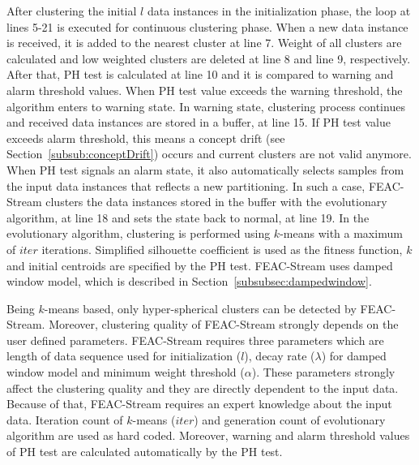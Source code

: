 \documentclass[smallcondensed]{svjour3}     %
\begin{document}
After clustering the initial $l$ data instances in the initialization phase, the loop at lines 5-21 is executed for continuous clustering phase. When a new data instance is received, it is added to the nearest cluster at line 7. Weight of all clusters are calculated and low weighted clusters are deleted at line 8 and line 9, respectively. After that, PH test is calculated at line 10 and it is compared to warning and alarm threshold values. When PH test value exceeds the warning threshold, the algorithm enters to warning state. In warning state, clustering process continues and received data instances are stored in a buffer, at line 15. If PH test value exceeds alarm threshold, this means a concept drift (see Section~\ref{subsub:conceptDrift}) occurs and current clusters are not valid anymore. When PH test signals an alarm state, it also automatically selects samples from the input data instances that reflects a new partitioning. In such a case, FEAC-Stream clusters the data instances stored in the buffer with the evolutionary algorithm, at line 18 and sets the state back to normal, at line 19. In the evolutionary algorithm, clustering is performed using $k$-means with a maximum of $iter$ iterations. Simplified silhouette coefficient is used as the fitness function, $k$ and initial centroids are specified by the PH test. FEAC-Stream uses damped window model, which is described in Section~\ref{subsubsec:dampedwindow}.

Being $k$-means based, only hyper-spherical clusters can be detected by FEAC-Stream. Moreover, clustering quality of FEAC-Stream strongly depends on the user defined parameters. FEAC-Stream requires three parameters which are length of data sequence used for initialization ($l$), decay rate ($\lambda$) for damped window model and minimum weight threshold ($\alpha$). These parameters strongly affect the clustering quality and they are directly dependent to the input data. Because of that, FEAC-Stream requires an expert knowledge about the input data. Iteration count of $k$-means ($iter$) and generation count of evolutionary algorithm are used as hard coded. Moreover, warning and alarm threshold values of PH test are calculated automatically by the PH test.
\end{document}
